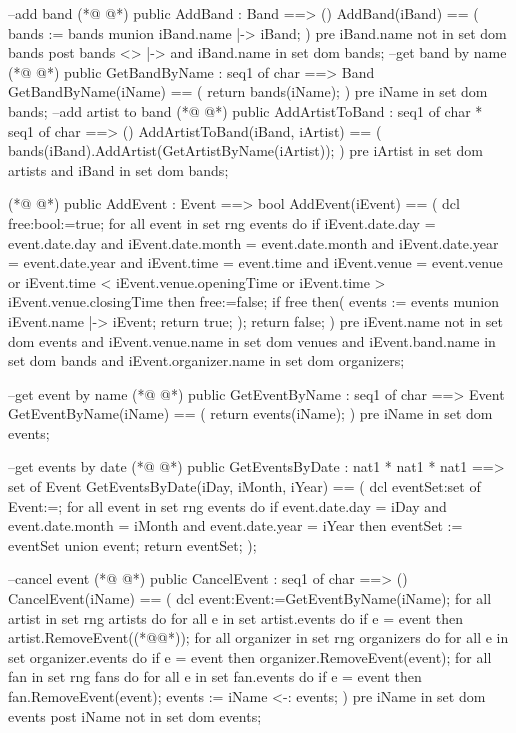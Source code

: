 \begin{vdmpp}[breaklines=true]
 --add band
(*@
\label{AddBand:89}
@*)
  public  AddBand : Band  ==> ()
  AddBand(iBand) == (
    bands := bands munion {iBand.name |-> iBand};
 )
  pre
   iBand.name not in set dom bands
  post 
  bands <> { |-> } and iBand.name in set dom bands;
  --get band by name
(*@
\label{GetBandByName:98}
@*)
  public GetBandByName : seq1 of char ==> Band
  GetBandByName(iName) == (
   return bands(iName);
  )
  pre iName in set dom bands;
  --add artist to band
(*@
\label{AddArtistToBand:104}
@*)
  public AddArtistToBand : seq1 of char * seq1 of char ==> ()
  AddArtistToBand(iBand, iArtist) == (
   bands(iBand).AddArtist(GetArtistByName(iArtist));
  )
  pre
   iArtist in set dom artists and
  iBand in set dom bands;


(*@
\label{AddEvent:113}
@*)
  public  AddEvent : Event  ==> bool
  AddEvent(iEvent) == (
   dcl free:bool:=true;
   for all event in set rng events do
    if iEvent.date.day = event.date.day and iEvent.date.month = event.date.month and iEvent.date.year = event.date.year and iEvent.time = event.time and iEvent.venue = event.venue or 
     iEvent.time < iEvent.venue.openingTime or iEvent.time > iEvent.venue.closingTime
    then free:=false;
   if free then(
     events := events munion {iEvent.name |-> iEvent};
     return true;
    );
    return false;
 )
 pre
  iEvent.name not in set dom events and
  iEvent.venue.name in set dom venues and
  iEvent.band.name in set dom bands and
  iEvent.organizer.name in set dom organizers;
  
  --get event by name
(*@
\label{GetEventByName:133}
@*)
  public GetEventByName : seq1 of char ==> Event
  GetEventByName(iName) == (
   return events(iName);
  )
  pre iName in set dom events;
  
  --get events by date
(*@
\label{GetEventsByDate:140}
@*)
  public GetEventsByDate : nat1 * nat1 * nat1 ==> set of Event
  GetEventsByDate(iDay, iMonth, iYear) == (
   dcl eventSet:set of Event:={};
   for all event in set rng events do
    if event.date.day = iDay and event.date.month = iMonth and event.date.year = iYear then eventSet := eventSet union {event};
   return eventSet;
  );
  
  --cancel event
(*@
\label{CancelEvent:149}
@*)
 public CancelEvent : seq1 of char ==> ()
 CancelEvent(iName) == (
  dcl event:Event:=GetEventByName(iName);
   for all artist in set rng artists do
    for all e in set artist.events do
     if e = event then artist.RemoveEvent((*@@*));
   for all organizer in set rng organizers do
    for all e in set organizer.events do
     if e = event then organizer.RemoveEvent(event);
   for all fan in set rng fans do
    for all e in set fan.events do
     if e = event then fan.RemoveEvent(event);
  events :=  {iName} <-: events;
 )
 pre
  iName in set dom events
 post
  iName not in set dom events;
  

\end{vdmpp}
